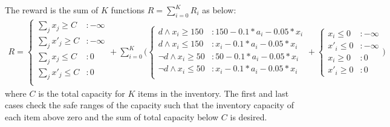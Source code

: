 \documentclass[twoside,11pt]{article}
\begin{document}
The reward is the sum of $K$ functions $R = \sum_{i=0}^K R_i $ as below:
{\footnotesize
\begin{align}
R =
\begin{cases}
\sum_{j} x_j \geq C &: -\infty  \\	
\sum_{j} x'_j \geq C &: -\infty 	\\
\sum_{j} x_j \leq C &:0\\  
\sum_{j} x'_j \leq C &: 0 	\\
\end{cases}
+
\sum_{i=0}^K \Bigg( \begin{cases}
d \wedge x_i \geq 150&: 150 - 0.1 * a_i - 0.05 * x_i \\
d \wedge x_i \leq 150 &:   x_i - 0.1 * a_i - 0.05 * x_i \\
\neg d \wedge x_i \geq 50 &: 50 - 0.1 * a_i - 0.05 * x_i  \\
\neg d \wedge x_i \leq 50 &: x_i - 0.1 * a_i - 0.05 * x_i  \\
\end{cases} 
+ 
\begin{cases}
x_i \leq 0 &: -\infty  \\	
x'_i \leq 0&: -\infty  \\	
x_i \geq 0 &:0\\
x'_i \geq 0 &: 0
\end{cases} \Bigg)
\label{rew_inv}
\end{align}}
where $C$ is the total capacity for $K$ items in the inventory. The first and last cases check the safe ranges of the capacity such that the inventory capacity of each item above zero and the sum of total capacity below $C$ is desired.
\end{document}
